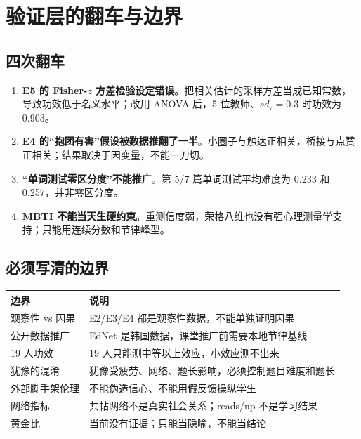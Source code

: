 \documentclass[UTF8,a4paper,11pt]{ctexart}
\begin{document}
\newpage


\section{验证层的翻车与边界}

\subsection{四次翻车}

\begin{enumerate}[leftmargin=2em]
\item \textbf{E5 的 Fisher-$z$ 方差检验设定错误}。把相关估计的采样方差当成已知常数，导致功效低于名义水平；改用 ANOVA 后，5 位教师、$sd_\tau=0.3$ 时功效为 0.903。
\item \textbf{E4 的“抱团有害”假设被数据推翻了一半}。小圈子与触达正相关，桥接与点赞正相关；结果取决于因变量，不能一刀切。
\item \textbf{“单词测试零区分度”不能推广}。第 5/7 篇单词测试平均难度为 0.233 和 0.257，并非零区分度。
\item \textbf{MBTI 不能当天生硬约束}。重测信度弱，荣格八维也没有强心理测量学支持；只能用连续分数和节律峰型。
\end{enumerate}

\subsection{必须写清的边界}

\begin{center}
\begin{longtable}{@{}p{4.2cm}p{9.0cm}@{}}
\toprule
\textbf{边界} & \textbf{说明} \\
\midrule
观察性 vs 因果 & E2/E3/E4 都是观察性数据，不能单独证明因果 \\
公开数据推广 & EdNet 是韩国数据，课堂推广前需要本地节律基线 \\
19 人功效 & 19 人只能测中等以上效应，小效应测不出来 \\
犹豫的混淆 & 犹豫受疲劳、网络、题长影响，必须控制题目难度和题长 \\
外部脚手架伦理 & 不能伪造信心、不能用假反馈操纵学生 \\
网络指标 & 共帖网络不是真实社会关系；reads/up 不是学习结果 \\
黄金比 & 当前没有证据；只能当隐喻，不能当结论 \\
\bottomrule
\end{longtable}
\end{center}
\end{document}
